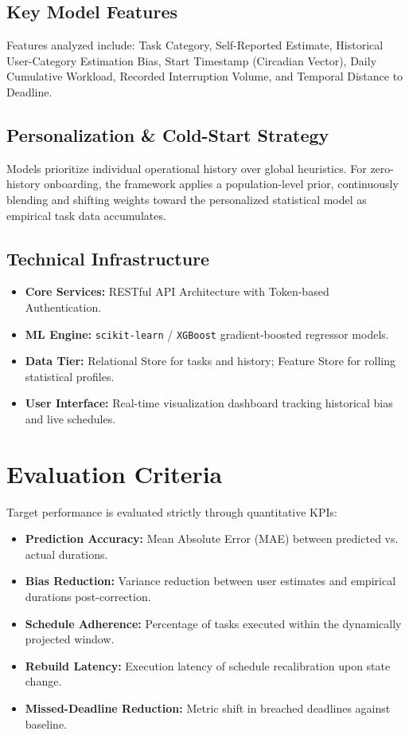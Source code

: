 \documentclass[11pt,a4paper]{article}
\begin{document}
\subsection{Key Model Features}
Features analyzed include: Task Category, Self-Reported Estimate, Historical User-Category Estimation Bias, Start Timestamp (Circadian Vector), Daily Cumulative Workload, Recorded Interruption Volume, and Temporal Distance to Deadline.

\subsection{Personalization \& Cold-Start Strategy}
Models prioritize individual operational history over global heuristics. For zero-history onboarding, the framework applies a population-level prior, continuously blending and shifting weights toward the personalized statistical model as empirical task data accumulates.

\subsection{Technical Infrastructure}
\begin{itemize}
    \item \textbf{Core Services:} RESTful API Architecture with Token-based Authentication.
    \item \textbf{ML Engine:} \texttt{scikit-learn} / \texttt{XGBoost} gradient-boosted regressor models.
    \item \textbf{Data Tier:} Relational Store for tasks and history; Feature Store for rolling statistical profiles.
    \item \textbf{User Interface:} Real-time visualization dashboard tracking historical bias and live schedules.
\end{itemize}

\section{Evaluation Criteria}
Target performance is evaluated strictly through quantitative KPIs:
\begin{itemize}
    \item \textbf{Prediction Accuracy:} Mean Absolute Error (MAE) between predicted vs. actual durations.
    \item \textbf{Bias Reduction:} Variance reduction between user estimates and empirical durations post-correction.
    \item \textbf{Schedule Adherence:} Percentage of tasks executed within the dynamically projected window.
    \item \textbf{Rebuild Latency:} Execution latency of schedule recalibration upon state change.
    \item \textbf{Missed-Deadline Reduction:} Metric shift in breached deadlines against baseline.
\end{itemize}
\end{document}
